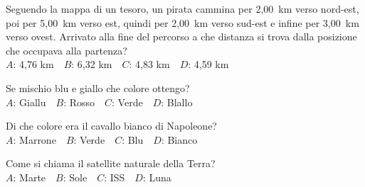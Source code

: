 \mcquestionfooter



\def\mcquestionnumber{9}


\mcquestionheader Seguendo la mappa di un tesoro, un pirata cammina per 2,00~km verso nord-est, poi per 5,00~km verso est, quindi per 2,00~km verso sud-est e infine per 3,00~km verso ovest. Arrivato alla fine del percorso a che distanza si trova dalla posizione che occupava alla partenza?\\
{$A$}: 4,76 km\ \ {$B$}: 6,32 km\ \ {$C$}: 4,83 km\ \ {$D$}: 4,59 km\ \ 

\mcquestionfooter



\def\mcquestionnumber{10}


\mcquestionheader Se mischio blu e giallo che colore ottengo?\\
{$A$}: Giallu\ \ {$B$}: Rosso\ \ {$C$}: Verde\ \ {$D$}: Blallo\ \ 

\mcquestionfooter



\def\mcquestionnumber{11}


\mcquestionheader Di che colore era il cavallo bianco di Napoleone?\\
{$A$}: Marrone\ \ {$B$}: Verde\ \ {$C$}: Blu\ \ {$D$}: Bianco\ \ 

\mcquestionfooter



\def\mcquestionnumber{12}


\mcquestionheader Come si chiama il satellite naturale della Terra?\\
{$A$}: Marte\ \ {$B$}: Sole\ \ {$C$}: ISS\ \ {$D$}: Luna\ \ 

\mcquestionfooter



\mcpaperfooter

\def\mcserialnumber{30}
\mcpaperheader


\def\mcquestionnumber{1}


